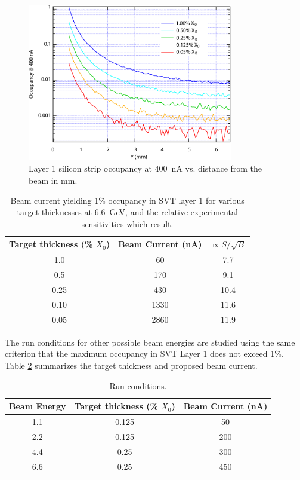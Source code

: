 \begin{figure}[t]
\includegraphics[width=0.8\textwidth]{performance/occupancy.pdf}
\caption{\small{Layer 1 silicon strip occupancy at 400~nA vs. distance from the
beam in mm.}}
\label{fig:occup}
\end{figure}

\begin{table}[ht]
\begin{center}
\begin{tabular}{|c|c|c|} \hline
  Target thickness (\% $X_0$) & Beam Current (nA) & $\propto S/\sqrt{B}$ \\ \hline
  1.0 & 60 & 7.7 \\ \hline
  0.5 & 170 & 9.1 \\ \hline
  0.25 & 430 & 10.4 \\ \hline
  0.10 & 1330 & 11.6 \\ \hline
  0.05 & 2860 & 11.9 \\ \hline
\end{tabular}
\end{center}
\caption{\small{Beam current yielding 1\% occupancy in SVT layer 1 for various target 
thicknesses at 6.6~GeV, and the relative experimental sensitivities which result.}}
\label{tab:occup}
\end{table}

The run conditions for other possible beam energies are studied using the same criterion that the maximum occupancy 
in SVT Layer 1 does not exceed 1\%. Table \ref{tab:runc} summarizes the target thickness and proposed beam current. 

\begin{table}[ht]
\begin{center}
\begin{tabular}{|c|c|c|} \hline
  Beam Energy & Target thickness (\% $X_0$) & Beam Current (nA) \\ \hline
  1.1 & 0.125 & 50 \\ \hline
  2.2 & 0.125 & 200 \\ \hline
  4.4 & 0.25  & 300 \\ \hline
  6.6 & 0.25 & 450 \\ \hline
\end{tabular}
\end{center}
\caption{\small{Run conditions.}}
\label{tab:runc}
\end{table}

